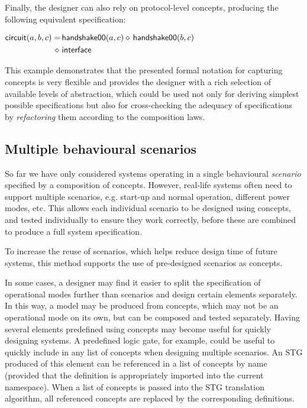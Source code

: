 \documentclass[british,compsoc]{IEEEtran}
\begin{document}
Finally, the designer can also rely on protocol-level concepts, producing
the following equivalent specification:

\begin{minipage}[t]{1\columnwidth}%

$\\\begin{aligned}\mathsf{circuit}(a, b, c)=&\mathsf{\,handshake00}(a, c) \diamond\,\mathsf{handshake00}(b, c)\\
\diamond\, &\mathsf{\,interface}
\end{aligned}$\\
\end{minipage}

This example demonstrates that the presented formal notation for capturing
concepts is very flexible and provides the designer with a rich selection
of available levels of abstraction, which could be used not only for
deriving simplest possible specifications but also for cross-checking
the adequacy of specifications by \emph{refactoring} them according
to the composition laws.

\subsection{Multiple behavioural scenarios\label{sub:scenarios}}

So far we have only considered systems operating in a single behavioural
\textit{scenario} specified by a composition of concepts. However,
real-life systems often need to support multiple scenarios, e.g. start-up
and normal operation, different power modes, etc. This allows
each individual scenario to be designed using concepts,
and tested individually to ensure they work correctly, before these
are combined to produce a full system specification.

To increase the reuse of scenarios, which helps reduce design
time of future systems, this method supports the use of pre-designed
scenarios as concepts.

In some cases, a designer may find it easier to split the specification
of operational modes further than scenarios and design certain elements
separately. In this way, a model may be produced from concepts, which
may not be an operational mode on its own, but can be composed and
tested separately. Having several elements predefined
using concepts may become useful for quickly designing systems. A
predefined logic gate, for example, could be useful to quickly include
in any list of concepts when designing multiple scenarios. An STG
produced of this element can be referenced in a list of concepts by
name (provided that the definition is appropriately imported into
the current namespace). When a list of concepts is passed into the
STG translation algorithm, all referenced concepts are replaced by
the corresponding definitions.
\end{document}
